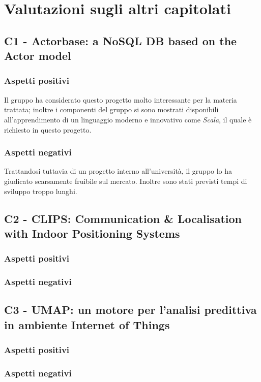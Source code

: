 \section{Valutazioni sugli altri capitolati}

\subsection{C1 - Actorbase: a NoSQL DB based on the Actor model}
\subsubsection{Aspetti positivi}
Il gruppo ha considerato questo progetto molto interessante per la materia trattata; inoltre
i componenti del gruppo si sono mostrati disponibili all'apprendimento di un linguaggio 
moderno e innovativo come \textit{Scala}, il quale \`e richiesto in questo progetto.
\subsubsection{Aspetti negativi}
Trattandosi tuttavia di un progetto interno all'universit\`a, il gruppo lo ha giudicato scarsamente
fruibile sul mercato. Inoltre sono stati previsti tempi di sviluppo troppo lunghi.


\subsection{C2 - CLIPS: Communication & Localisation with Indoor Positioning Systems}
\subsubsection{Aspetti positivi}
\subsubsection{Aspetti negativi}

\subsection{C3 - UMAP: un motore per l'analisi predittiva in ambiente Internet of Things}
\subsubsection{Aspetti positivi}
\subsubsection{Aspetti negativi}


